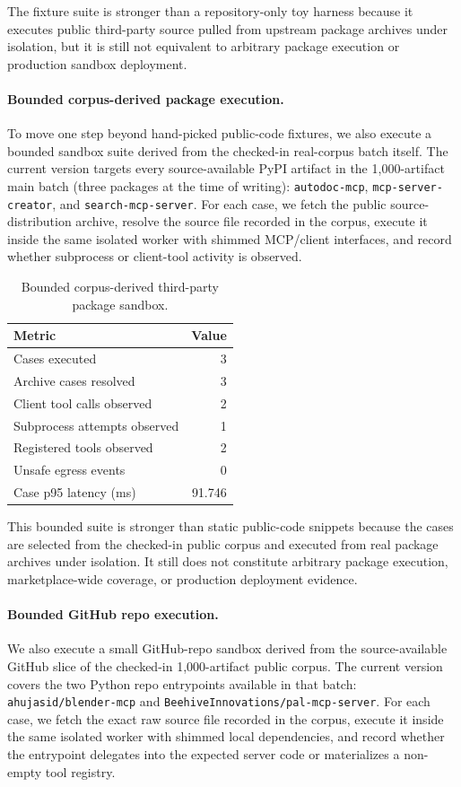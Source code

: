 \documentclass[10pt]{article}
\begin{document}
The fixture suite is stronger than a repository-only toy harness because it executes public third-party source pulled from upstream package archives under isolation, but it is still not equivalent to arbitrary package execution or production sandbox deployment.

\paragraph{Bounded corpus-derived package execution.}
To move one step beyond hand-picked public-code fixtures, we also execute a bounded sandbox suite derived from the checked-in real-corpus batch itself. The current version targets every source-available PyPI artifact in the 1{,}000-artifact main batch (three packages at the time of writing): \texttt{autodoc-mcp}, \texttt{mcp-server-creator}, and \texttt{search-mcp-server}. For each case, we fetch the public source-distribution archive, resolve the source file recorded in the corpus, execute it inside the same isolated worker with shimmed MCP/client interfaces, and record whether subprocess or client-tool activity is observed.

\begin{table}[t]
\centering
\caption{Bounded corpus-derived third-party package sandbox.}
\label{tab:corpus_package_sandbox}
\begin{tabular}{lr}
\toprule
Metric & Value \\
\midrule
Cases executed & 3 \\
Archive cases resolved & 3 \\
Client tool calls observed & 2 \\
Subprocess attempts observed & 1 \\
Registered tools observed & 2 \\
Unsafe egress events & 0 \\
Case p95 latency (ms) & 91.746 \\
\bottomrule
\end{tabular}
\end{table}

This bounded suite is stronger than static public-code snippets because the cases are selected from the checked-in public corpus and executed from real package archives under isolation. It still does not constitute arbitrary package execution, marketplace-wide coverage, or production deployment evidence.


\paragraph{Bounded GitHub repo execution.}
We also execute a small GitHub-repo sandbox derived from the source-available GitHub slice of the checked-in 1{,}000-artifact public corpus. The current version covers the two Python repo entrypoints available in that batch: \texttt{ahujasid/blender-mcp} and \texttt{BeehiveInnovations/pal-mcp-server}. For each case, we fetch the exact raw source file recorded in the corpus, execute it inside the same isolated worker with shimmed local dependencies, and record whether the entrypoint delegates into the expected server code or materializes a non-empty tool registry.
\end{document}
